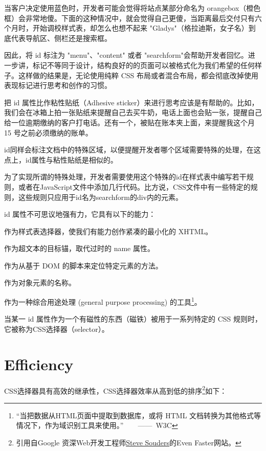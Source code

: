 当客户决定使用蓝色时，开发者可能会觉得将站点某部分命名为 orangebox（橙色框）会非常地傻。下面的这种情况中，就会觉得自己更傻，当距离最后交付只有六个月时，开始调校样式表，却怎么也想不起来 "Gladys"（格拉迪斯，女子名）到底代表导航区、侧栏还是搜索框。

因此，将 id 标注为 "menu"、"content" 或者 "searchform"会帮助开发者回忆。进一步讲，标记不等同于设计，结构良好的的页面可以被格式化为我们希望的任何样子。这样做的结果是，无论使用纯粹 CSS 布局或者混合布局，都会彻底改掉使用表现标记进行思考和创作的习惯。

把 id 属性比作粘性贴纸（Adhesive sticker）来进行思考应该是有帮助的。比如，我们会在冰箱上拍一张贴纸来提醒自己去买牛奶，电话上面也会贴一张，提醒自己给一位逾期缴纳的客户打电话。还有一个，被贴在账本夹上面，来提醒我这个月 15 号之前必须缴纳的账单。

id同样会标注文档中的特殊区域，以便提醒开发者哪个区域需要特殊的处理，在这点上，id属性与粘性贴纸是相似的。

为了实现所谓的特殊处理，开发者需要使用这个特殊的id在样式表中编写若干规则，或者在JavaScript文件中添加几行代码。比方说，CSS文件中有一些特定的规则，这些规则只应用于id名为searchform的div内的元素。

id 属性不可思议地强有力，它具有以下的能力：

\begin{compactitem}
\item 作为样式表选择器，使我们有能力创作紧凑的最小化的 XHTML。
\item 作为超文本的目标锚，取代过时的 name 属性。
\item 作为从基于 DOM 的脚本来定位特定元素的方法。
\item 作为对象元素的名称。
\item 作为一种综合用途处理 (general purpose processing) 的工具\footnote{“当把数据从HTML页面中提取到数据库，或将 HTML 文档转换为其他格式等情况下，作为域识别工具来使用。”$\qquad$——~W3C}。
\end{compactitem}

当某一 id 属性作为一个有磁性的东西（磁铁）被用于一系列特定的 CSS 规则时，它被称为CSS选择器（selector）。

\clearpage

\section{Efficiency}

CSS选择器具有高效的继承性，CSS选择器效率从高到低的排序\footnote{引用自Google 资深Web开发工程师\href{http://stevesouders.com/}{Steve Souders}的Even Faster网站。}如下：

